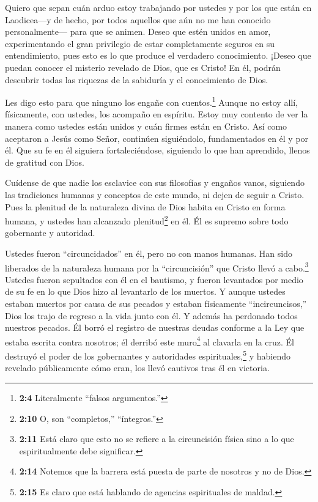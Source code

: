  Quiero que sepan cuán arduo estoy trabajando por ustedes y
por los que están en Laodicea---y de hecho, por todos aquellos que aún
no me han conocido personalmente---  para que se animen.
Deseo que estén unidos en amor, experimentando el gran privilegio de
estar completamente seguros en su entendimiento, pues esto es lo que
produce el verdadero conocimiento. ¡Deseo que puedan conocer el misterio
revelado de Dios, que es Cristo!  En él, podrán descubrir
todas las riquezas de la sabiduría y el conocimiento de Dios.

 Les digo esto para que ninguno los engañe con
cuentos.\footnote{\textbf{2:4} Literalmente ``falsos argumentos.''}
 Aunque no estoy allí, físicamente, con ustedes, los
acompaño en espíritu. Estoy muy contento de ver la manera como ustedes
están unidos y cuán firmes están en Cristo.  Así como
aceptaron a Jesús como Señor, continúen siguiéndolo, 
fundamentados en él y por él. Que su fe en él siguiera fortaleciéndose,
siguiendo lo que han aprendido, llenos de gratitud con Dios.

 Cuídense de que nadie los esclavice con sus filosofías y
engaños vanos, siguiendo las tradiciones humanas y conceptos de este
mundo, ni dejen de seguir a Cristo.  Pues la plenitud de la
naturaleza divina de Dios habita en Cristo en forma humana,
 y ustedes han alcanzado plenitud\footnote{\textbf{2:10} O,
  son ``completos,'' ``íntegros.''} en él. Él es supremo sobre todo
gobernante y autoridad.

 Ustedes fueron ``circuncidados'' en él, pero no con manos
humanas. Han sido liberados de la naturaleza humana por la
``circuncisión'' que Cristo llevó a cabo.\footnote{\textbf{2:11} Está
  claro que esto no se refiere a la circuncisión física sino a lo que
  espiritualmente debe significar.}  Ustedes fueron
sepultados con él en el bautismo, y fueron levantados por medio de su fe
en lo que Dios hizo al levantarlo de los muertos.  Y aunque
ustedes estaban muertos por causa de sus pecados y estaban físicamente
``incircuncisos,'' Dios los trajo de regreso a la vida junto con él. Y
además ha perdonado todos nuestros pecados.  Él borró el
registro de nuestras deudas conforme a la Ley que estaba escrita contra
nosotros; él derribó este muro\footnote{\textbf{2:14} Notemos que la
  barrera está puesta de parte de nosotros y no de Dios.} al clavarla en
la cruz.  Él destruyó el poder de los gobernantes y
autoridades espirituales,\footnote{\textbf{2:15} Es claro que está
  hablando de agencias espirituales de maldad.} y habiendo revelado
públicamente cómo eran, los llevó cautivos tras él en victoria.

